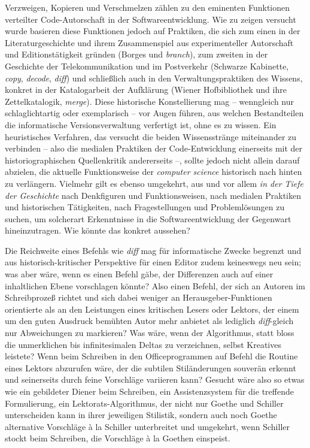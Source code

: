\documentclass[a4paper,10pt]{article}
\begin{document}
Verzweigen, Kopieren und Verschmelzen zählen zu den eminenten Funktionen verteilter Code-Autorschaft in der Softwareentwicklung. Wie zu zeigen versucht wurde basieren diese Funktionen jedoch auf Praktiken, die sich zum einen in der Literaturgeschichte und ihrem Zusammenspiel aus experimenteller Autorschaft und Editionstätigkeit gründen (Borges und \emph{branch}), zum zweiten in der Geschichte der Telekommunikation und im Postverkehr (Schwarze Kabinette, \emph{copy}, \emph{decode}, \emph{diff}) und schließlich auch in den Verwaltungspraktiken des Wissens, konkret in der Katalogarbeit der Aufklärung (Wiener Hofbibliothek und ihre Zettelkatalogik, \emph{merge}). Diese historische Konstellierung mag – wenngleich nur schlaglichtartig oder exemplarisch – vor Augen führen, aus welchen Bestandteilen die informatische Versionsverwaltung verfertigt ist, ohne es zu wissen. Ein heuristisches Verfahren, das versucht die beiden Wissensstränge miteinander zu verbinden – also die medialen Praktiken der Code-Entwicklung einerseits mit der historiographischen Quellenkritik andererseits –, sollte jedoch nicht allein darauf abzielen, die aktuelle Funktionsweise der \emph{computer science} historisch nach hinten zu verlängern. Vielmehr gilt es ebenso umgekehrt, aus und vor allem \emph{in der Tiefe der Geschichte} nach Denkfiguren und Funktionsweisen, nach medialen Praktiken und historischen Tätigkeiten, nach Fragestellungen und Problemlösungen zu suchen, um solcherart Erkenntnisse in die Softwareentwicklung der Gegenwart hineinzutragen. Wie könnte das konkret aussehen? 

Die Reichweite eines Befehls wie \emph{diff} mag für informatische Zwecke begrenzt und aus historisch-kritischer Perspektive für einen Editor zudem keineswegs neu sein; was aber wäre, wenn es einen Befehl gäbe, der Differenzen auch auf einer inhaltlichen Ebene vorschlagen könnte? Also einen Befehl, der sich an Autoren im Schreibprozeß richtet und sich dabei weniger an Herausgeber-Funktionen orientierte als an den Leistungen eines kritischen Lesers oder Lektors, der einem um den guten Ausdruck bemühten Autor mehr anbietet als lediglich \emph{diff}-gleich nur Abweichungen zu markieren? Was wäre, wenn der Algorithmus, statt bloss die unmerklichen bis infinitesimalen Deltas zu verzeichnen, selbst Kreatives leistete? Wenn beim Schreiben in den Officeprogrammen auf Befehl die Routine eines Lektors abzurufen wäre, der die subtilen Stiländerungen souverän erkennt und seinerseits durch feine Vorschläge variieren kann? Gesucht wäre also so etwas wie ein gebildeter Diener beim Schreiben, ein Assistenzsystem für die treffende Formulierung, ein Lektorats-Algorithmus, der nicht nur Goethe und Schiller unterscheiden kann in ihrer jeweiligen Stilistik, sondern auch noch Goethe alternative Vorschläge à la Schiller unterbreitet und umgekehrt, wenn Schiller stockt beim Schreiben, die Vorschläge à la Goethen einspeist.
\end{document}
